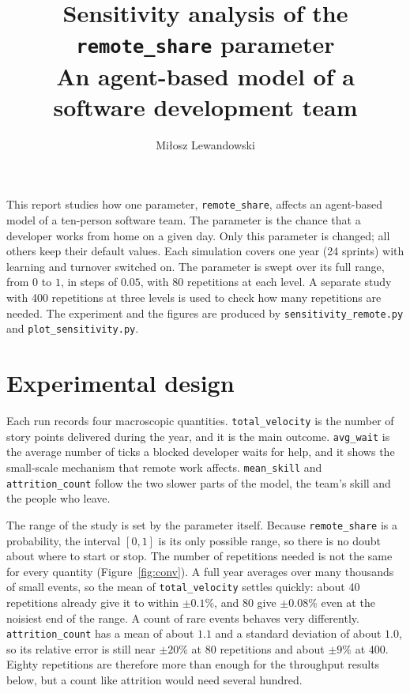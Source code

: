 \documentclass[11pt,a4paper]{article}
\title{Sensitivity analysis of the \texttt{remote\_share} parameter\\
       \large An agent-based model of a software development team}
\author{Miłosz Lewandowski}
\date{}
\begin{document}
\maketitle
\vspace{-1.5em}

\noindent
This report studies how one parameter, \texttt{remote\_share}, affects an agent-based model of a
ten-person software team. The parameter is the chance that a developer works from home on a given
day. Only this parameter is changed; all others keep their default values. Each simulation covers
one year (24 sprints) with learning and turnover switched on. The parameter is swept over its full
range, from $0$ to $1$, in steps of $0.05$, with 80 repetitions at each level. A separate study with
400 repetitions at three levels is used to check how many repetitions are needed. The experiment and
the figures are produced by \texttt{sensitivity\_remote.py} and \texttt{plot\_sensitivity.py}.

\section{Experimental design}

Each run records four macroscopic quantities. \texttt{total\_velocity} is the number of story points
delivered during the year, and it is the main outcome. \texttt{avg\_wait} is the average number of
ticks a blocked developer waits for help, and it shows the small-scale mechanism that remote work
affects. \texttt{mean\_skill} and \texttt{attrition\_count} follow the two slower parts of the model,
the team's skill and the people who leave.

The range of the study is set by the parameter itself. Because \texttt{remote\_share} is a
probability, the interval $[0,1]$ is its only possible range, so there is no doubt about where to
start or stop. The number of repetitions needed is not the same for every quantity
(Figure~\ref{fig:conv}). A full year averages over many thousands of small events, so the mean of
\texttt{total\_velocity} settles quickly: about 40 repetitions already give it to within $\pm0.1\%$,
and 80 give $\pm0.08\%$ even at the noisiest end of the range. A count of rare events behaves very
differently. \texttt{attrition\_count} has a mean of about $1.1$ and a standard deviation of about
$1.0$, so its relative error is still near $\pm20\%$ at 80 repetitions and about $\pm9\%$ at 400.
Eighty repetitions are therefore more than enough for the throughput results below, but a count like
attrition would need several hundred.
\end{document}
